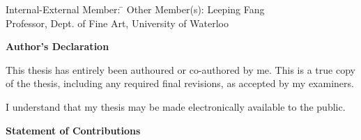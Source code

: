   \noindent
\begin{tabbing}
Internal-External Member: \=  \kill %
Other Member(s): \> Leeping Fang \\
\> Professor, Dept. of Fine Art, University of Waterloo \\
\end{tabbing}

\cleardoublepage

 \begin{center}\textbf{Author's Declaration}\end{center}
  
 \noindent
This thesis has entirely been authoured or co-authored by me. This is a true copy of the thesis, including any required final revisions, as accepted by my examiners.

  \bigskip
  
  \noindent
I understand that my thesis may be made electronically available to the public.

\cleardoublepage

  \begin{center}\textbf{Statement of Contributions}\end{center}
  
